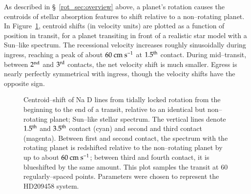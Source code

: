 As described in \S~\ref{rot_sec:overview} above, a planet's rotation
causes the centroids of stellar absorption features to shift relative
to a non--rotating planet.  In Figure~\ref{rot_fig:delta v}, centroid
shifts (in velocity units) are plotted as a function of position in
transit, for a planet transiting in front of a realistic star model
with a Sun--like spectrum. The recessional velocity increases roughly
sinusoidally during ingress, reaching a peak of about $60 {\rm
~cm~s^{-1}}$ at $1.5^{\rm th}$ contact.  During mid--transit, between
$2^{\rm nd}$ and $3^{\rm rd}$ contacts, the net velocity shift is much
smaller.  Egress is nearly perfectly symmetrical with ingress, though
the velocity shifts have the opposite sign.
\begin{figure}[p]
\caption[Centroid--shift of Na D lines due to tidally locked rotation,
relative to an identical but non--rotating planet.]{Centroid--shift of
Na D lines from tidally locked rotation from the beginning to the end
of a transit, relative to an identical but non--rotating planet;
Sun--like stellar spectrum.  The vertical lines denote $1.5^{\rm th}$
and $3.5^{\rm th}$ contact (cyan) and second and third contact
(magenta).  Between first and second contact, the spectrum with the
rotating planet is redshifted relative to the non--rotating planet by
up to about $60 {\rm ~cm~s^{-1}}$; between third and fourth contact,
it is blueshifted by the same amount.  This plot samples the transit
at 60 regularly--spaced points.  Parameters were chosen to represent
the HD209458 system.}
\label{rot_fig:delta v}
\end{figure}
\afterpage{\clearpage}

